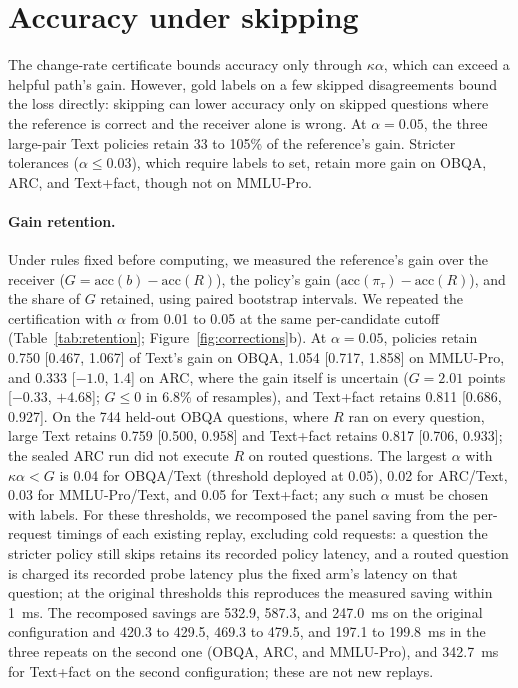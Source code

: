 \section{Accuracy under skipping}\label{app:accuracy}

The change-rate certificate bounds accuracy only through $\kappa\alpha$, which can exceed a helpful path's gain. However, gold labels on a few skipped disagreements bound the loss directly: skipping can lower accuracy only on skipped questions where the reference is correct and the receiver alone is wrong. At $\alpha=0.05$, the three large-pair Text policies retain 33 to 105\% of the reference's gain. Stricter tolerances ($\alpha\le0.03$), which require labels to set, retain more gain on OBQA, ARC, and Text+fact, though not on MMLU-Pro.

\paragraph{Gain retention.} Under rules fixed before computing, we measured the reference's gain over the receiver ($G=\mathrm{acc}(b)-\mathrm{acc}(R)$), the policy's gain ($\mathrm{acc}(\pi_\tau)-\mathrm{acc}(R)$), and the share of $G$ retained, using paired bootstrap intervals. We repeated the certification with $\alpha$ from 0.01 to 0.05 at the same per-candidate cutoff (Table~\ref{tab:retention}; Figure~\ref{fig:corrections}b). At $\alpha=0.05$, policies retain 0.750 [0.467, 1.067] of Text's gain on OBQA, 1.054 [0.717, 1.858] on MMLU-Pro, and 0.333 [$-1.0$, 1.4] on ARC, where the gain itself is uncertain ($G=2.01$ points [$-0.33$, $+4.68$]; $G\le0$ in 6.8\% of resamples), and Text+fact retains 0.811 [0.686, 0.927]. On the 744 held-out OBQA questions, where $R$ ran on every question, large Text retains 0.759 [0.500, 0.958] and Text+fact retains 0.817 [0.706, 0.933]; the sealed ARC run did not execute $R$ on routed questions. The largest $\alpha$ with $\kappa\alpha<G$ is 0.04 for OBQA/Text (threshold deployed at 0.05), 0.02 for ARC/Text, 0.03 for MMLU-Pro/Text, and 0.05 for Text+fact; any such $\alpha$ must be chosen with labels. For these thresholds, we recomposed the panel saving from the per-request timings of each existing replay, excluding cold requests: a question the stricter policy still skips retains its recorded policy latency, and a routed question is charged its recorded probe latency plus the fixed arm's latency on that question; at the original thresholds this reproduces the measured saving within 1~ms. The recomposed savings are 532.9, 587.3, and 247.0~ms on the original configuration and 420.3 to 429.5, 469.3 to 479.5, and 197.1 to 199.8~ms in the three repeats on the second one (OBQA, ARC, and MMLU-Pro), and 342.7~ms for Text+fact on the second configuration; these are not new replays.

